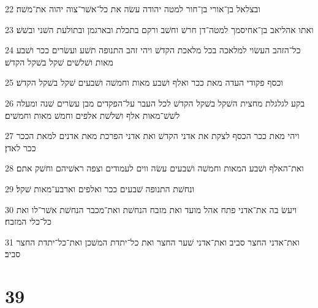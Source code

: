 \par 22 ובצלאל בן־אורי בן־חור למטה יהודה עשׂה את כל־אשׁר־צוה יהוה את־משׁה׃
\par 23 ואתו אהליאב בן־אחיסמך למטה־דן חרשׁ וחשׁב ורקם בתכלת ובארגמן ובתולעת השׁני ובשׁשׁ׃
\par 24 כל־הזהב העשׂוי למלאכה בכל מלאכת הקדשׁ ויהי זהב התנופה תשׁע ועשׂרים ככר ושׁבע מאות ושׁלשׁים שׁקל בשׁקל הקדשׁ׃
\par 25 וכסף פקודי העדה מאת ככר ואלף ושׁבע מאות וחמשׁה ושׁבעים שׁקל בשׁקל הקדשׁ׃
\par 26 בקע לגלגלת מחצית השׁקל בשׁקל הקדשׁ לכל העבר על־הפקדים מבן עשׂרים שׁנה ומעלה לשׁשׁ־מאות אלף ושׁלשׁת אלפים וחמשׁ מאות וחמשׁים׃
\par 27 ויהי מאת ככר הכסף לצקת את אדני הקדשׁ ואת אדני הפרכת מאת אדנים למאת הככר ככר לאדן׃
\par 28 ואת־האלף ושׁבע המאות וחמשׁה ושׁבעים עשׂה ווים לעמודים וצפה ראשׁיהם וחשׁק אתם׃
\par 29 ונחשׁת התנופה שׁבעים ככר ואלפים וארבע־מאות שׁקל׃
\par 30 ויעשׂ בה את־אדני פתח אהל מועד ואת מזבח הנחשׁת ואת־מכבר הנחשׁת אשׁר־לו ואת כל־כלי המזבח׃
\par 31 ואת־אדני החצר סביב ואת־אדני שׁער החצר ואת כל־יתדת המשׁכן ואת־כל־יתדת החצר סביב׃

\chapter{39}

